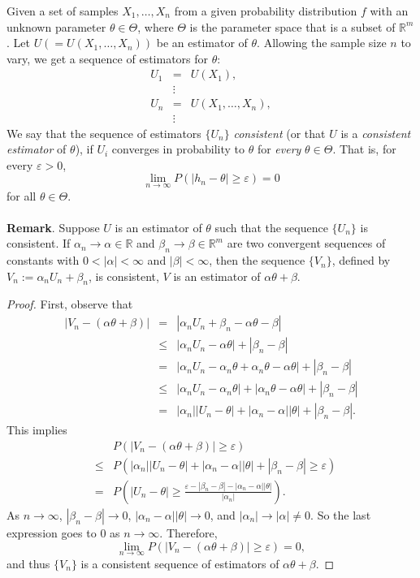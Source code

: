\documentclass[12pt]{article}
\begin{document}
Given a set of samples $X_1,\ldots,X_n$ from a given probability
distribution $f$ with an unknown parameter $\theta\in\Theta$, where
$\Theta$ is the parameter space that is a subset of $\mathbb{R}^m$.
Let $U(=U(X_1,\ldots,X_n))$ be an estimator of $\theta$. Allowing
the sample size $n$ to vary, we get a sequence of estimators for
$\theta$:
\begin{eqnarray*}
U_1 &=& U(X_1),\\
&\vdots& \\
U_n &=& U(X_1,\ldots,X_n), \\
&\vdots&
\end{eqnarray*}
We say that the sequence of estimators $\lbrace U_n \rbrace$
\emph{consistent} (or that $U$ is a \emph{consistent estimator} of
$\theta$), if $U_i$ converges in probability to $\theta$ for
\emph{every} $\theta\in\Theta$.  That is, for every $\varepsilon>0$,
$$\lim_{n\rightarrow\infty}P(|h_n-\theta|\geq\varepsilon)=0$$
for all $\theta\in\Theta$.
\\\\
\textbf{Remark}.  Suppose $U$ is an estimator of $\theta$ such that
the sequence $\lbrace U_n\rbrace$ is consistent.  If
$\alpha_n\to\alpha\in\mathbb{R}$ and $\beta_n\to\beta\in
\mathbb{R}^m$ are two convergent sequences of constants with
$0<|\alpha|<\infty$ and $|\beta|<\infty$, then the sequence $\lbrace
V_n\rbrace$, defined by $V_n:=\alpha_n U_n+\beta_n$, is consistent,
$V$ is an estimator of $\alpha\theta + \beta$.
\begin{proof}
First, observe that
\begin{eqnarray*}
|V_n-(\alpha\theta+\beta)| &=&
|\alpha_nU_n+\beta_n-\alpha\theta-\beta|\\
&\le&|\alpha_nU_n-\alpha\theta|+|\beta_n-\beta|\\
&=&|\alpha_nU_n-\alpha_n\theta+\alpha_n\theta-\alpha\theta|+|\beta_n-\beta|\\
&\le&|\alpha_nU_n-\alpha_n\theta|+|\alpha_n\theta-\alpha\theta|+|\beta_n-\beta|\\
&=&|\alpha_n||U_n-\theta|+|\alpha_n-\alpha||\theta|+|\beta_n-\beta|.
\end{eqnarray*}
This implies
\begin{eqnarray*}
&& P(|V_n-(\alpha\theta+\beta)|\ge\varepsilon)
\\&\le& P(|\alpha_n||U_n-\theta|+|\alpha_n-\alpha|
|\theta|+|\beta_n-\beta|\ge\varepsilon)
\\&=&P(|U_n-\theta|\ge
\frac{\varepsilon-|\beta_n-\beta|-|\alpha_n-\alpha||\theta|}{|\alpha_n|}).
\end{eqnarray*}
As $n\to\infty$, $|\beta_n-\beta|\to 0$,
$|\alpha_n-\alpha||\theta|\to 0$, and $|\alpha_n|\to|\alpha|\ne 0$.
So the last expression goes to $0$ as $n\to\infty$. Therefore,
$$\lim_{n\to\infty}P(|V_n-(\alpha\theta+\beta)|\ge\varepsilon)=0,$$
and thus $\lbrace V_n\rbrace$ is a consistent sequence of estimators
of $\alpha\theta+\beta$.
\end{proof}
\end{document}
